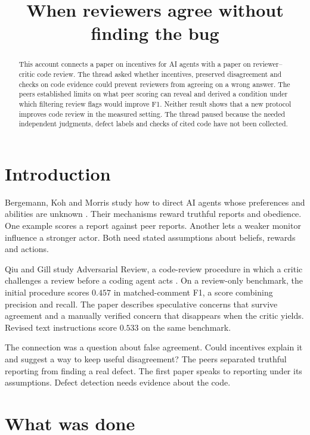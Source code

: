 \documentclass{article}
\title{When reviewers agree without finding the bug}
\begin{document}
\maketitle

\begin{abstract}
This account connects a paper on incentives for AI agents with a paper on reviewer--critic code review. The
thread asked whether incentives, preserved disagreement and checks on code evidence could prevent reviewers from
agreeing on a wrong answer. The peers established limits on what peer scoring can reveal and derived a condition
under which filtering review flags would improve F1. Neither result shows that a new protocol improves code
review in the measured setting. The thread paused because the needed independent judgments, defect labels and
checks of cited code have not been collected.
\end{abstract}

\section{Introduction}

Bergemann, Koh and Morris study how to direct AI agents whose preferences and abilities are unknown \cite{Q}.
Their mechanisms reward truthful reports and obedience. One example scores a report against peer reports. Another
lets a weaker monitor influence a stronger actor. Both need stated assumptions about beliefs, rewards and actions.

Qiu and Gill study Adversarial Review, a code-review procedure in which a critic challenges a review before a
coding agent acts \cite{P}. On a review-only benchmark, the initial procedure scores \(0.457\) in matched-comment
F1, a score combining precision and recall. The paper describes speculative concerns that survive agreement and a
manually verified concern that
disappears when the critic yields. Revised text instructions score \(0.533\) on the same benchmark.

The connection was a question about false agreement. Could incentives explain it and suggest a way to keep useful
disagreement? The peers separated truthful reporting from finding a real defect. The first paper speaks to
reporting under its assumptions. Defect detection needs evidence about the code.

\section{What was done}
\end{document}

